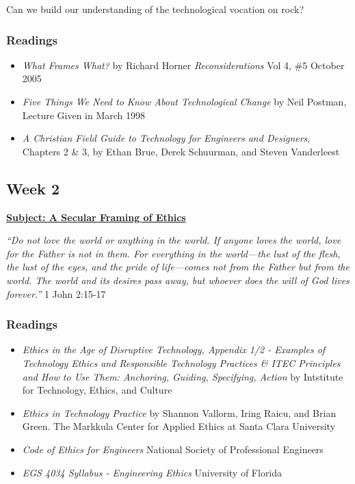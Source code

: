\documentclass[11pt]{article}
\begin{document}
Can we build our understanding of the technological vocation on rock?
\subsubsection*{Readings}
\label{sec:org10546bf}
\begin{itemize}
\item \emph{What Frames What?} by Richard Horner \emph{Reconsiderations} Vol 4, \#5 October
2005
\item \emph{Five Things We Need to Know About Technological Change} by Neil Postman,
Lecture Given in March 1998
\item \emph{A Christian Field Guide to Technology for Engineers and Designers}, Chapters
2 \& 3, by Ethan Brue, Derek Schuurman, and Steven Vanderleest
\end{itemize}
\subsection*{Week 2}
\label{sec:orge45259e}
\textbf{\uline{Subject: A Secular Framing of Ethics}}
\begin{mdframed}[nobreak=true]
\emph{``Do not love the world or anything in the world. If anyone loves the world,
love for the Father is not in them. For everything in the world—the lust
of the flesh, the lust of the eyes, and the pride of life—comes not from the
Father but from the world. The world and its desires pass away, but whoever
does the will of God lives forever.''} 1 John 2:15-17
\end{mdframed}
\subsubsection*{Readings}
\label{sec:orgba235c7}
\begin{itemize}
\item \emph{Ethics in the Age of Disruptive Technology, Appendix 1/2 - Examples of
Technology Ethics and Responsible Technology Practices \& ITEC Principles and
How to Use Them: Anchoring, Guiding, Specifying, Action} by Intstitute for
Technology, Ethics, and Culture
\item \emph{Ethics in Technology Practice} by Shannon Vallorm, Iring Raicu, and Brian
Green. The Markkula Center for Applied Ethics at Santa Clara University
\item \emph{Code of Ethics for Engineers} National Society of Professional Engineers
\item \emph{EGS 4034 Syllabus - Engineering Ethics} University of Florida
\end{itemize}
\end{document}
